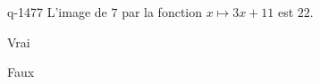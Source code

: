 \begin{truefalse}{q-1477}
L'image de $7$ par la fonction $x\mapsto 3x+11$ est $22$.
\item Vrai
\item* Faux
\end{truefalse}

